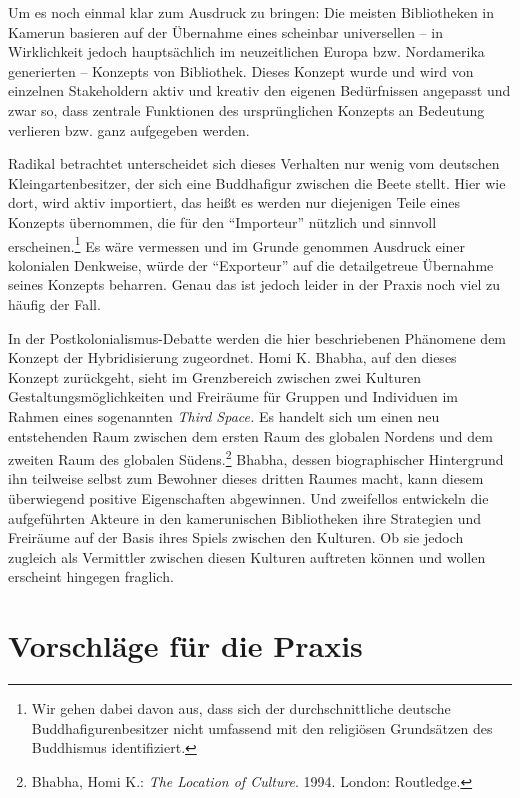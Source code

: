 \documentclass[a4paper,
fontsize=11pt,
oneside,
numbers=noperiodatend,
parskip=half-,
bibliography=totoc,
final
]{scrartcl}
\begin{document}
Um es noch einmal klar zum Ausdruck zu bringen: Die meisten Bibliotheken
in Kamerun basieren auf der Übernahme eines scheinbar universellen -- in
Wirklichkeit jedoch hauptsächlich im neuzeitlichen Europa bzw.
Nordamerika generierten -- Konzepts von Bibliothek. Dieses Konzept wurde
und wird von einzelnen Stakeholdern aktiv und kreativ den eigenen
Bedürfnissen angepasst und zwar so, dass zentrale Funktionen des
ursprünglichen Konzepts an Bedeutung verlieren bzw. ganz aufgegeben
werden.

Radikal betrachtet unterscheidet sich dieses Verhalten nur wenig vom
deutschen Kleingartenbesitzer, der sich eine Buddhafigur zwischen die
Beete stellt. Hier wie dort, wird aktiv importiert, das heißt es werden
nur diejenigen Teile eines Konzepts übernommen, die für den
\enquote{Importeur} nützlich und sinnvoll erscheinen.\footnote{Wir gehen
  dabei davon aus, dass sich der durchschnittliche deutsche
  Buddhafigurenbesitzer nicht umfassend mit den religiösen Grundsätzen
  des Buddhismus identifiziert.} Es wäre vermessen und im Grunde
genommen Ausdruck einer kolonialen Denkweise, würde der
\enquote{Exporteur} auf die detailgetreue Übernahme seines Konzepts
beharren. Genau das ist jedoch leider in der Praxis noch viel zu häufig
der Fall.

In der Postkolonialismus-Debatte werden die hier beschriebenen Phänomene
dem Konzept der Hybridisierung zugeordnet. Homi K. Bhabha, auf den
dieses Konzept zurückgeht, sieht im Grenzbereich zwischen zwei Kulturen
Gestaltungsmöglichkeiten und Freiräume für Gruppen und Individuen im
Rahmen eines sogenannten \emph{Third Space.} Es handelt sich um einen
neu entstehenden Raum zwischen dem ersten Raum des globalen Nordens und
dem zweiten Raum des globalen Südens.\footnote{Bhabha, Homi K.:
  \emph{The Location of Culture}. 1994. London: Routledge.} Bhabha,
dessen biographischer Hintergrund ihn teilweise selbst zum Bewohner
dieses dritten Raumes macht, kann diesem überwiegend positive
Eigenschaften abgewinnen. Und zweifellos entwickeln die aufgeführten
Akteure in den kamerunischen Bibliotheken ihre Strategien und Freiräume
auf der Basis ihres Spiels zwischen den Kulturen. Ob sie jedoch zugleich
als Vermittler zwischen diesen Kulturen auftreten können und wollen
erscheint hingegen fraglich.

\section*{Vorschläge für die
Praxis}\label{vorschluxe4ge-fuxfcr-die-praxis}
\end{document}
